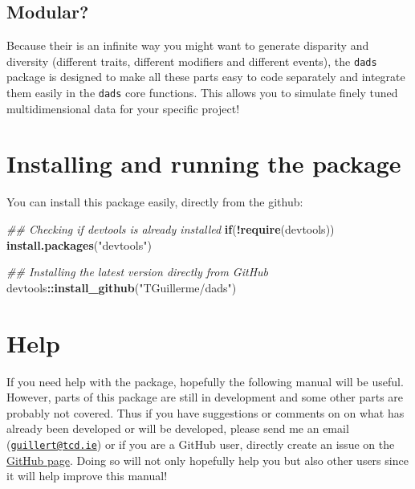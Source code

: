\documentclass[]{book}
\newenvironment{Shaded}{\begin{snugshade}}{\end{snugshade}}
\newcommand{\CommentTok}[1]{\textcolor[rgb]{0.56,0.35,0.01}{\textit{#1}}}
\newcommand{\ControlFlowTok}[1]{\textcolor[rgb]{0.13,0.29,0.53}{\textbf{#1}}}
\newcommand{\KeywordTok}[1]{\textcolor[rgb]{0.13,0.29,0.53}{\textbf{#1}}}
\newcommand{\NormalTok}[1]{#1}
\newcommand{\OperatorTok}[1]{\textcolor[rgb]{0.81,0.36,0.00}{\textbf{#1}}}
\newcommand{\StringTok}[1]{\textcolor[rgb]{0.31,0.60,0.02}{#1}}
\begin{document}
\hypertarget{modular}{%
\subsection{Modular?}\label{modular}}

Because their is an infinite way you might want to generate disparity and diversity (different traits, different modifiers and different events), the \texttt{dads} package is designed to make all these parts easy to code separately and integrate them easily in the \texttt{dads} core functions.
This allows you to simulate finely tuned multidimensional data for your specific project!

\hypertarget{installing-and-running-the-package}{%
\section{Installing and running the package}\label{installing-and-running-the-package}}

You can install this package easily, directly from the github:

\begin{Shaded}
\begin{Highlighting}[]
\CommentTok{## Checking if devtools is already installed}
\ControlFlowTok{if}\NormalTok{(}\OperatorTok{!}\KeywordTok{require}\NormalTok{(devtools)) }\KeywordTok{install.packages}\NormalTok{(}\StringTok{"devtools"}\NormalTok{)}

\CommentTok{## Installing the latest version directly from GitHub}
\NormalTok{devtools}\OperatorTok{::}\KeywordTok{install_github}\NormalTok{(}\StringTok{"TGuillerme/dads"}\NormalTok{)}
\end{Highlighting}
\end{Shaded}

\hypertarget{help}{%
\section{Help}\label{help}}

If you need help with the package, hopefully the following manual will be useful.
However, parts of this package are still in development and some other parts are probably not covered.
Thus if you have suggestions or comments on on what has already been developed or will be developed, please send me an email (\href{mailto:guillert@tcd.ie}{\nolinkurl{guillert@tcd.ie}}) or if you are a GitHub user, directly create an issue on the \href{https://github.com/TGuillerme/dads}{GitHub page}.
Doing so will not only hopefully help you but also other users since it will help improve this manual!
\end{document}
